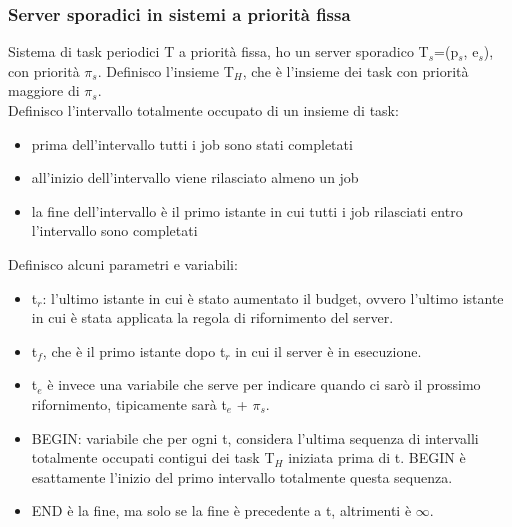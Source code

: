 \documentclass[12pt, oneside]{extbook}
\begin{document}
\subsubsection{Server sporadici in sistemi a priorità fissa}
Sistema di task periodici T a priorità fissa, ho un server sporadico T$_{s}$=(p$_{s}$, e$_{s}$), con priorità $\pi_{s}$. Definisco l'insieme T$_{H}$, che è l'insieme dei task con priorità maggiore di $\pi_{s}$.\\ Definisco l'intervallo totalmente occupato di un insieme di task:
\begin{itemize}
\item prima dell'intervallo tutti i job sono stati completati
\item all'inizio dell'intervallo viene rilasciato almeno un job
\item la fine dell'intervallo è il primo istante in cui tutti i job rilasciati entro l'intervallo sono completati
\end{itemize}
Definisco alcuni parametri e variabili:
\begin{itemize}
\item t$_{r}$: l'ultimo istante in cui è stato aumentato il budget, ovvero l'ultimo istante in cui è stata applicata la regola di rifornimento del server.
\item t$_{f}$, che è il primo istante dopo t$_{r}$ in cui il server è in esecuzione.
\item t$_{e}$ è invece una variabile che serve per indicare quando ci sarò il prossimo rifornimento, tipicamente sarà t$_{e}$ + $\pi_{s}$.
\item BEGIN: variabile che per ogni t, considera l'ultima sequenza di intervalli totalmente occupati contigui dei task T$_{H}$ iniziata prima di t. BEGIN è esattamente l'inizio del primo intervallo totalmente questa sequenza.
\item END è la fine, ma solo se la fine è precedente a t, altrimenti è $\infty$.
\end{itemize}
\end{document}
